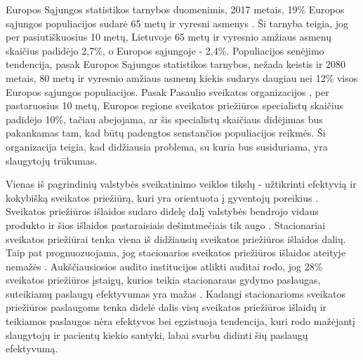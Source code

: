
Europos Sąjungos statistikos tarnybos duomenimis, 2017 metais, 19\% Europos sąjungos populiacijos sudarė 65 metų ir vyresni asmenys \cite{Eurostat}. Ši tarnyba teigia, jog per pasiutiškuosius 10 metų, Lietuvoje 65 metų ir vyresnio amžiaus asmenų skaičius padidėjo 2,7\%, o Europos sąjungoje - 2,4\%. Populiacijos senėjimo tendencija, pasak Europos Sąjungos statistikos tarnybos, nežada keistis ir 2080 metais, 80 metų ir vyresnio amžiaus asmenų kiekis sudarys daugiau nei 12\% visos Europos sąjungos populiacijos. Pasak Pasaulio sveikatos organizacijos \cite{Organization2012}, per pastaruosius 10 metų, Europos regione sveikatos priežiūros specialistų skaičius padidėjo 10\%, tačiau abejojama, ar šis specialistų skaičiaus didėjimas bus pakankamas tam, kad būtų padengtos senstančios populiacijos reikmės. Ši organizacija teigia, kad didžiausia problema, su kuria bus susiduriama, yra slaugytojų trūkumas.

Vienas iš pagrindinių valstybės sveikatinimo veiklos tikslų - užtikrinti efektyvią ir kokybišką sveikatos priežiūrą, kuri yra orientuota į gyventojų poreikius \cite{Ataskaita2018}. Sveikatos priežiūros išlaidos sudaro didelę dalį valstybės bendrojo vidaus produkto ir šios išlaidos pastaraisiais dešimtmečiais tik augo \cite{higiena}. Stacionariai sveikatos priežiūrai tenka viena iš didžiausių sveikatos priežiūros išlaidos dalių. Taip pat prognuozuojama, jog stacionarios sveikatos priežiūros išlaidos ateityje nemažės \cite{higiena}. Aukščiausiosios audito institucijos atlikti auditai rodo, jog 28\% sveikatos priežiūros įstaigų, kurios teikia stacionaraus gydymo paslaugas, suteikiamų paslaugų efektyvumas yra mažas \cite{Ataskaita2018}. Kadangi stacionarioms sveikatos priežiūros paslaugoms tenka didelė dalis visų sveikatos priežiūros išlaidų ir teikiamos paslaugos nėra efektyvos bei egzistuoja tendencija, kuri rodo mažėjantį slaugytojų ir pacientų kiekio santyki, labai svarbu didinti šių paslaugų efektyvumą.

